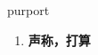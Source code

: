 
\begin{frame}
{\huge purport}
\begin{center}
\begin{enumerate}\Large
  \item \textbf{声称，打算}
\end{enumerate}
\end{center}
\end{frame}

